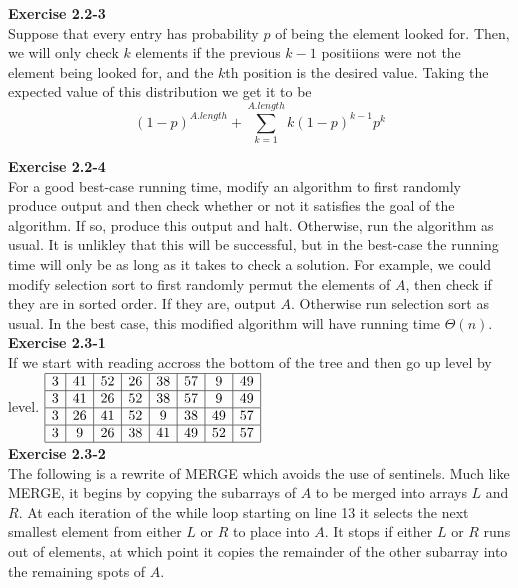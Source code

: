 \documentclass{article}
\begin{document}
\noindent\textbf{ Exercise 2.2-3}\\

Suppose that every entry has probability $p$ of being the element looked for. Then, we will only check $k$ elements if the previous $k-1$ positiions were not the element being looked for, and the $k$th position is the desired value. Taking the expected value of this distribution we get it to be
\[
(1-p)^{A.length} + \sum_{k=1}^{A.length} k(1-p)^{k-1}p^k
\]

\noindent\textbf{Exercise 2.2-4}\\

For a good best-case running time, modify an algorithm to first randomly produce output and then check whether or not it satisfies the goal of the algorithm.  If so, produce this output and halt.  Otherwise, run the algorithm as usual.  It is unlikley that this will be successful, but in the best-case the running time will only be as long as it takes to check a solution.  For example, we could modify selection sort to first randomly permut the elements of $A$, then check if they are in sorted order.  If they are, output $A$.  Otherwise run selection sort as usual.  In the best case, this modified algorithm will have running time $\Theta(n)$. \\

\noindent\textbf{Exercise 2.3-1}\\

If we start with reading accross the bottom of the tree and then go up level by level.
$
\begin{array}{|c|c|c|c|c|c|c|c|}
\hline
3&41&52&26&38&57&9&49\\
\hline
3&41&26&52&38&57&9&49\\
\hline
3&26&41&52&9&38&49&57\\
\hline
3&9&26&38&41&49&52&57\\
\hline
\end{array}
$\\

\noindent\textbf{Exercise 2.3-2}\\

The following is a rewrite of MERGE which avoids the use of sentinels.  Much like MERGE, it begins by copying the subarrays of $A$ to be merged into arrays $L$ and $R$.  At each iteration of the while loop starting on line 13 it selects the next smallest element from either $L$ or $R$ to place into $A$.  It stops if either $L$ or $R$ runs out of elements, at which point it copies the remainder of the other subarray into the remaining spots of $A$.  \\
\end{document}
